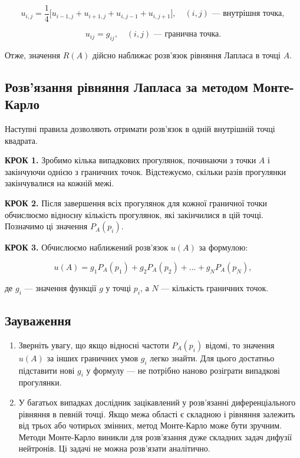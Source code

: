 \documentclass[
  ukrainian,
]{article}
\begin{document}
\[u_{i,j} = \frac{1}{4}\bigl[u_{i-1,j} + u_{i+1,j} + u_{i,j-1} + u_{i,j+1}\bigr], \quad (i,j) \text{ — внутрішня точка},\]

\[u_{ij} = g_{ij}, \quad (i,j) \text{ — гранична точка}.\]

Отже, значення \(R(A)\) дійсно наближає розв'язок рівняння Лапласа в
точці \(A\).

\subsection{Розв'язання рівняння Лапласа за методом
Монте-Карло}\label{ux440ux43eux437ux432ux44fux437ux430ux43dux43dux44f-ux440ux456ux432ux43dux44fux43dux43dux44f-ux43bux430ux43fux43bux430ux441ux430-ux437ux430-ux43cux435ux442ux43eux434ux43eux43c-ux43cux43eux43dux442ux435-ux43aux430ux440ux43bux43e}

Наступні правила дозволяють отримати розв'язок в одній внутрішній точці
квадрата.

\textbf{КРОК 1.} Зробимо кілька випадкових прогулянок, починаючи з точки
\(A\) і закінчуючи однією з граничних точок. Відстежуємо, скільки разів
прогулянки закінчувалися на кожній межі.

\textbf{КРОК 2.} Після завершення всіх прогулянок для кожної граничної
точки обчислюємо відносну кількість прогулянок, які закінчилися в цій
точці. Позначимо ці значення \(P_A(p_i)\).

\textbf{КРОК 3.} Обчислюємо наближений розв'язок \(u(A)\) за формулою:

\[u(A) = g_1 P_A(p_1) + g_2 P_A(p_2) + \dots + g_N P_A(p_N),\]

де \(g_i\) --- значення функції \(g\) у точці \(p_i\), а \(N\) ---
кількість граничних точок.

\subsection{Зауваження}\label{ux437ux430ux443ux432ux430ux436ux435ux43dux43dux44f-14}

\begin{enumerate}
\def\labelenumi{\arabic{enumi}.}
\item
  Зверніть увагу, що якщо відносні частоти \(P_A(p_i)\) відомі, то
  значення \(u(A)\) за інших граничних умов \(g_i\) легко знайти. Для
  цього достатньо підставити нові \(g_i\) у формулу --- не потрібно
  наново розіграти випадкові прогулянки.
\item
  У багатьох випадках дослідник зацікавлений у розв'язанні
  диференціального рівняння в певній точці. Якщо межа області є складною
  і рівняння залежить від трьох або чотирьох змінних, метод Монте-Карло
  може бути зручним. Методи Монте-Карло виникли для розв'язання дуже
  складних задач дифузії нейтронів. Ці задачі не можна розв'язати
  аналітично.
\end{enumerate}
\end{document}
